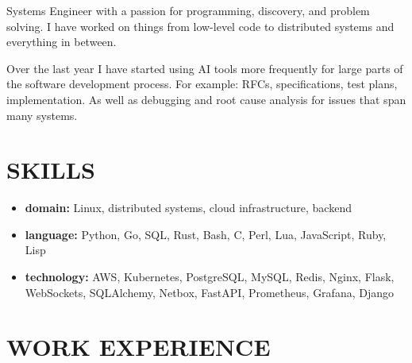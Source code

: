 \documentclass{res}
\begin{document}
\address{john@jjdev.com - (714) 895 6311 - Westminster, CA 92683}

\begin{resume}
    Systems Engineer with a passion for programming, discovery, and
    problem solving.  I have worked on things from low-level code
    to distributed systems and everything in between.

    Over the last year I have started using AI tools more frequently
    for large parts of the software development process.  For
    example:  RFCs, specifications, test plans, implementation. As
    well as debugging and root cause analysis for issues that span
    many systems.

\section{SKILLS}
\begin{itemize}
  \item
    {\bf domain:} Linux, distributed systems, cloud infrastructure, backend
  \item
    {\bf language:} Python, Go, SQL, Rust, Bash, C, Perl, Lua, JavaScript, Ruby, Lisp
  \item
    {\bf technology:} AWS, Kubernetes, PostgreSQL, MySQL, Redis, Nginx,
    Flask, WebSockets, SQLAlchemy, Netbox, FastAPI, Prometheus, Grafana, Django
  \end{itemize}

\section{WORK EXPERIENCE}


\end{resume}
\end{document}

